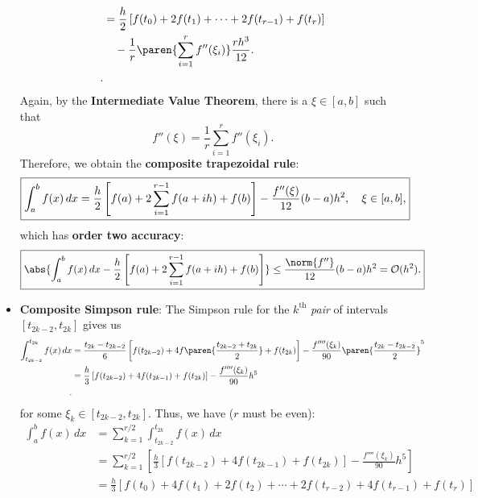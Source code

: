 \documentclass{report}
\begin{document}
\begin{itemize}
\begin{align*}
                &= \frac{h}{2} \left[f(t_0) + 2f(t_1) + \cdots + 2f(t_{r-1}) + f(t_r)\right] \\
                &\quad -  \frac{1}{r} \paren{\sum_{i=1}^r f''(\xi_i)} \frac{rh^3}{12}. \\
            .\end{align*}
            \bigbreak \noindent 
            Again, by the \textbf{Intermediate Value Theorem}, there is a $\xi \in [a,b]$ such that
            $$f''(\xi) = \frac{1}{r} \sum_{i=1}^r f''(\xi_i).$$
            Therefore, we obtain the \textbf{composite trapezoidal rule}:
            $$
            \fbox{${\displaystyle
                    \int_a^b f(x)\,dx = \frac{h}{2}\left[f(a) + 2 \sum_{i=1}^{r-1} f(a + ih) + f(b)\right] - \frac{f''(\xi)}{12} (b - a) h^2, 
                    \quad \xi \in [a,b],
            }$}
            $$
            which has \textbf{order two accuracy}:
            $$
            \fbox{${\displaystyle
                    \abs{\int_a^b f(x)\,dx - \frac{h}{2}\left[f(a) + 2 \sum_{i=1}^{r-1} f(a + ih) + f(b)\right]} \leq  \frac{\norm{f''}}{12} (b - a) h^2 = \mathcal{O}(h^2).
            }$}
            $$
        \item \textbf{ Composite Simpson rule}:
            The Simpson rule for the $k^{\mathrm{th}}$ \textit{pair} of intervals $[t_{2k-2},t_{2k}]$ gives us
            \begin{align*}
                \int_{t_{2k-2}}^{t_{2k}} f(x)\,dx 
                & = \frac{t_{2k} - t_{2k-2}}{6}\left[f(t_{2k-2}) + 4f\paren{\frac{t_{2k-2} + t_{2k}}{2}} + f(t_{2k})\right] -\frac{f''''(\xi_k)}{90} \paren{\frac{t_{2k} - t_{2k-2}}{2}}^5 \\
                & = \frac{h}{3}\left[f(t_{2k-2}) + 4f(t_{2k-1}) + f(t_{2k})\right] -\frac{f''''(\xi_k)}{90} h^5 \\
            .\end{align*}
            for some $\xi_k \in [t_{2k-2},t_{2k}]$.
            \bigbreak \noindent 
            Thus, we have ($r$ must be even):
            \begin{align*}
                \int_a^b f(x)\,dx 
                &= \sum_{k=1}^{r/2} \int_{t_{2k-2}}^{t_{2k}} f(x)\,dx \\
                &= \sum_{k=1}^{r/2} \left[\frac{h}{3}\left[f(t_{2k-2}) + 4f(t_{2k-1}) + f(t_{2k})\right] -\frac{f''''(\xi_k)}{90} h^5\right] \\
                &= \frac{h}{3} \left[f(t_0) + 4f(t_1) + 2f(t_2) + \cdots + 2f(t_{r-2}) + 4f(t_{r-1}) + f(t_r) \right]\\

\end{align*}
\end{itemize}
\end{document}
